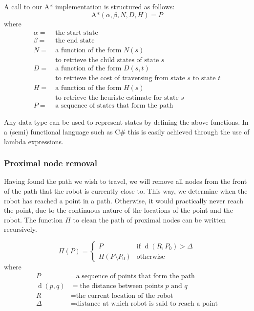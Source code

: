 \documentclass[10pt, abstracton, twocolumn]{scrartcl}
\DeclareMathOperator{\dist}{d}
\begin{document}
\begin{samepage}

A call to our A* implementation is structured as follows:
\nopagebreak
\[
\textrm{A*}(\alpha,\beta,N,D,H) = P
\]
\nopagebreak
where
\begin{align*}
\alpha =&\ \textrm{the start state} \\
\beta =&\ \textrm{the end state} \\
N =&\ \textrm{a function of the form $N(s)$} \\
&\ \textrm{to retrieve the child states of state $s$} \\
D =&\ \textrm{a function of the form $D(s,t)$} \\
&\ \textrm{to retrieve the cost of traversing from state $s$ to state $t$} \\
H =&\ \textrm{a function of the form $H(s)$} \\
&\ \textrm{to retrieve the heuristc estimate for state $s$} \\
P =&\ \textrm{a sequence of states that form the path}
\end{align*}

\end{samepage}

Any data type can be used to represent states by defining the above functions. In a (semi) functional language such as C\# this is easily achieved through the use of lambda expressions.

\subsubsection{Proximal node removal}
Having found the path we wish to travel, we will remove all nodes from the front of the path that the robot is currently close to. This way, we determine when the robot has reached a point in a path. Otherwise, it would practically never reach the point, due to the continuous nature of the locations of the point and the robot. The function $\Pi$ to clean the path of proximal nodes can be written recursively.

\begin{samepage}

\[
\Pi(P) =
        \begin{cases}
        P & \textrm{if } \dist(R,P_0) > \Delta \\
        \Pi( P \setminus P_0 ) & \textrm{otherwise}
        \end{cases}
\]
\nopagebreak
where
\begin{align*}
P &= \textrm{a sequence of points that form the path} \\
\dist(p,q) &= \textrm{the distance between points $p$ and $q$} \\
R &= \textrm{the current location of the robot} \\
\Delta &= \textrm{distance at which robot is said to reach a point}
\end{align*}

\end{samepage}
\end{document}
